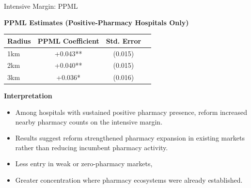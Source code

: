 \documentclass{beamer}
\begin{document}
\begin{frame}{Intensive Margin: PPML}

\textbf{PPML Estimates (Positive-Pharmacy Hospitals Only)}

\begin{table}[htbp]
\centering
\small
\begin{tabular}{lccc}
\toprule
\textbf{Radius} & \textbf{PPML Coefficient} & \textbf{Std. Error} \\
\midrule
1km & +0.043** & (0.015) \\
2km & +0.040** & (0.015) \\
3km & +0.036* & (0.016) \\
\bottomrule
\end{tabular}
\end{table}

\vspace{0.3cm}

\textbf{Interpretation}

\begin{itemize}
    \item Among hospitals with sustained positive pharmacy presence, reform increased nearby pharmacy counts on the intensive margin.

    \item Results suggest reform strengthened pharmacy expansion in existing markets rather than reducing incumbent pharmacy activity.
    
    \item Less entry in weak or zero-pharmacy markets,
    \item Greater concentration where pharmacy ecosystems were already established.
    
\end{itemize}

\end{frame}
\end{document}
